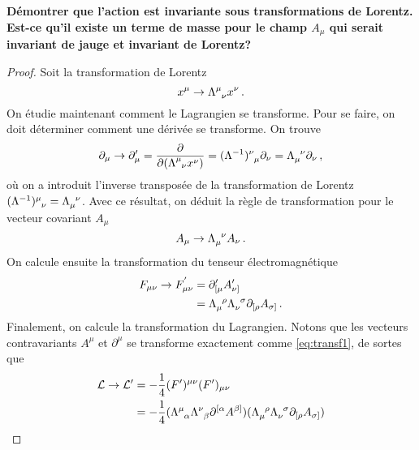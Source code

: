 \documentclass{article}
\numberwithin{equation}{section}
\theoremstyle{solution}
\begin{document}
\subsection{}
\textbf{Démontrer que l’action est invariante sous transformations de Lorentz. Est-ce qu’il existe
un terme de masse pour le champ $A_{\mu}$ qui serait invariant de jauge et invariant de Lorentz?}
\vspace{2ex}
\begin{proof}
Soit la transformation de Lorentz
\begin{equation}\label{eq:transf1}
        x^{\mu} \rightarrow \Lambda\indices{^\mu_\nu} x^\nu \, .
\end{equation} 
On étudie maintenant comment le Lagrangien se transforme. Pour se faire, on doit déterminer comment une 
dérivée se transforme. On trouve
\begin{equation}
        \partial_\mu \rightarrow \partial_\mu' = \frac{\partial }{\partial (\Lambda\indices{^\mu_\nu} x^\nu)} = (\Lambda^{-1})\indices{^{\nu}_\mu}\partial_{\nu}= \Lambda\indices{_\mu^\nu}\partial_{\nu}\, ,
\end{equation} 
où on a introduit l'inverse transposée de la transformation de Lorentz $(\Lambda^{-1})\indices{^{\mu}_{\nu}} = \Lambda\indices{_\mu^{\nu}}$. Avec ce résultat, 
on déduit la règle de transformation pour le vecteur covariant $A_{\mu}$
\begin{equation}
        A_{\mu} \rightarrow  \Lambda\indices{_{\mu}^{\nu}}A_{\nu}\, .
\end{equation} 
On calcule ensuite la transformation du tenseur électromagnétique
\begin{align*}
        F_{\mu\nu}\rightarrow F^{'}_{\mu\nu} &= \partial'_{[\mu} A'_{\nu]}\\
                 &= \Lambda\indices{_{\mu}^{\rho}}\Lambda\indices{_{\nu}^{\sigma}}\partial_{[\rho} A_{\sigma]}\, .
\end{align*}
Finalement, on calcule la transformation du Lagrangien. Notons que les vecteurs contravariants $A^{\mu}$ et $\partial^{\mu}$ se transforme 
exactement comme \eqref{eq:transf1}, de sortes que
\begin{align*}
        \mathcal{L} \rightarrow \mathcal{L}' &= -\frac{1}{4}(F')^{\mu\nu}(F')_{\mu\nu} \\
        &= -\frac{1}{4}(\Lambda\indices{^{\mu}_{\alpha}}\Lambda\indices{^{\nu}_{\beta}}\partial^{[\alpha}A^{\beta]})(\Lambda\indices{_{\mu}^{\rho}}\Lambda\indices{_{\nu}^{\sigma}}\partial_{[\rho} A_{\sigma]}) \\

\end{align*}
\end{proof}
\end{document}
